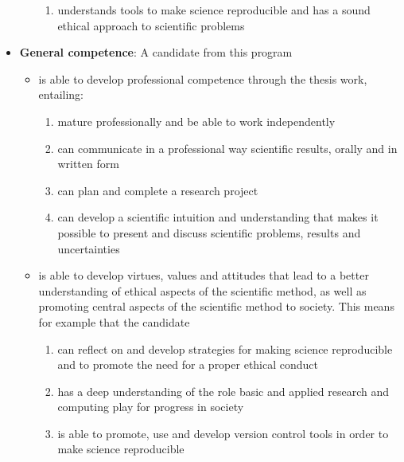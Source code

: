 \documentclass[%
oneside,                 %
final,                   %
10pt]{article}
\begin{document}
\begin{itemize}
\begin{itemize}
\begin{enumerate}
\item understands tools to make science reproducible and has a sound ethical approach to scientific problems

\end{enumerate}

\noindent
\end{itemize}

\noindent
\item \textbf{General competence}: A candidate from this program
\begin{itemize}

 \item is able to develop professional competence through the thesis work, entailing:
\begin{enumerate}

 \item mature professionally and be able to work independently

 \item can communicate in a professional way scientific results, orally and in written form

 \item can plan and complete a research project

 \item can develop a scientific intuition and understanding that makes it possible to present and discuss scientific problems, results and uncertainties

\end{enumerate}

\noindent
 \item is able to develop virtues, values and attitudes that lead to  a better understanding of ethical aspects of the scientific method, as well as promoting central aspects of the scientific method to society. This means for example that the candidate
\begin{enumerate}

 \item can reflect on and develop strategies for making science reproducible and to promote the need for a proper ethical conduct

 \item has a deep understanding of the role basic and applied  research and computing play for progress in society

 \item is able to promote, use and develop version control tools in order to make science reproducible


\end{enumerate}
\end{itemize}
\end{itemize}
\end{document}
